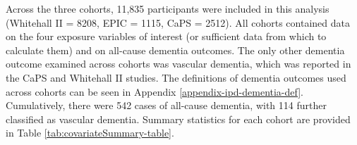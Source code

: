 \documentclass[a4paper, twoside]{templates/ociamthesis}
\begin{document}
Across the three cohorts, 11,835 participants were included in this analysis (Whitehall II = 8208, EPIC = 1115, CaPS = 2512). All cohorts contained data on the four exposure variables of interest (or sufficient data from which to calculate them) and on all-cause dementia outcomes. The only other dementia outcome examined across cohorts was vascular dementia, which was reported in the CaPS and Whitehall II studies. The definitions of dementia outcomes used across cohorts can be seen in Appendix \ref{appendix-ipd-dementia-def}. Cumulatively, there were 542 cases of all-cause dementia, with 114 further classified as vascular dementia. Summary statistics for each cohort are provided in Table \ref{tab:covariateSummary-table}.

~
\end{document}
